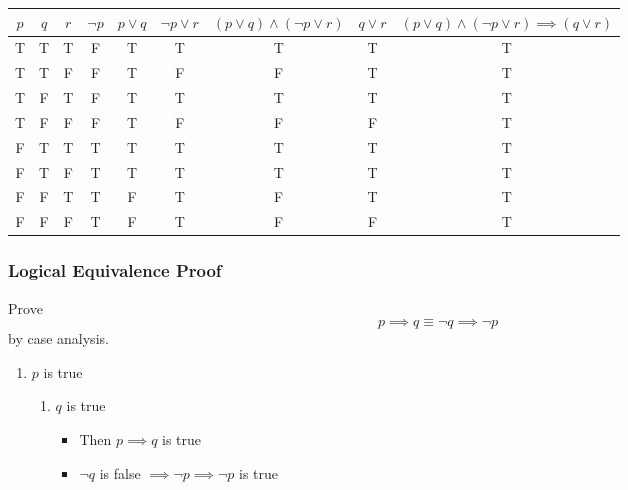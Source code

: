 \documentclass{article}
\begin{document}
\begin{tabular}{ | c | c | c | c | c | c | c | c | c | }
	$ p $ & $ q $ & $ r $ & $ \neg p $ & $ p \lor q $ & $ \neg p \lor r $ & $ ( p \lor q ) \land ( \neg p \lor r ) $ & $ q \lor r $ & $ ( p \lor q ) \land ( \neg p \lor r ) \implies ( q \lor r ) $ \\
	\hline
	T & T & T & F & T & T & T & T & T \\
	T & T & F & F & T & F & F & T & T \\
	T & F & T & F & T & T & T & T & T \\
	T & F & F & F & T & F & F & F & T \\
	F & T & T & T & T & T & T & T & T \\
	F & T & F & T & T & T & T & T & T \\
	F & F & T & T & F & T & F & T & T \\
	F & F & F & T & F & T & F & F & T 
\end{tabular}

\subsubsection{Logical Equivalence Proof}

Prove $$ p \implies q \equiv \neg q \implies \neg p $$ by case analysis.

\begin{enumerate}[label = \textbf{Case \arabic*}]
	\item $ p $ is true
		\begin{enumerate}[label = \textbf{Subcase \arabic*}]
			\item $ q $ is true
				\begin{itemize}
					\item Then $ p \implies q $ is true
					\item $ \neg q $ is false $ \implies \neg p \implies \neg p $ is true
				\end{itemize}
		\end{enumerate}
\end{enumerate}
\end{document}
